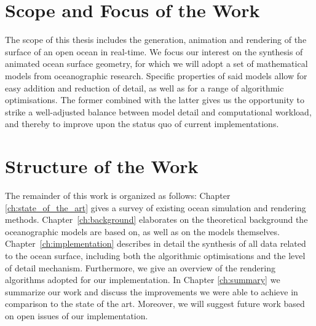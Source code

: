 \section{Scope and Focus of the Work}
\label{sec:scope_and_focus}
The scope of this thesis includes the generation, animation and rendering of the
surface of an open ocean in real-time. We focus our interest on the synthesis of
animated ocean surface geometry, for which we will adopt a set of mathematical
models from oceanographic research. Specific properties of said models allow for
easy addition and reduction of detail, as well as for a range of algorithmic
optimisations. The former combined with the latter gives us the opportunity to
strike a well-adjusted balance between model detail and computational workload,
and thereby to improve upon the status quo of current implementations.
%
%
\section{Structure of the Work}
\label{sec:structure}
The remainder of this work is organized as follows: Chapter
\ref{ch:state_of_the_art} gives a survey of existing ocean simulation and
rendering methods. Chapter~\ref{ch:background} elaborates on the theoretical
background the oceanographic models are based on, as well as on the models
themselves. Chapter~\ref{ch:implementation} describes in detail the
synthesis of all data related to the ocean surface, including both the algorithmic
optimisations and the level of detail mechanism. Furthermore, we give an overview
of the rendering algorithms adopted for our implementation. In Chapter
\ref{ch:summary} we summarize our work and discuss the improvements we were able
to achieve in comparison to the state of the art. Moreover, we will suggest
future work based on open issues of our implementation.
